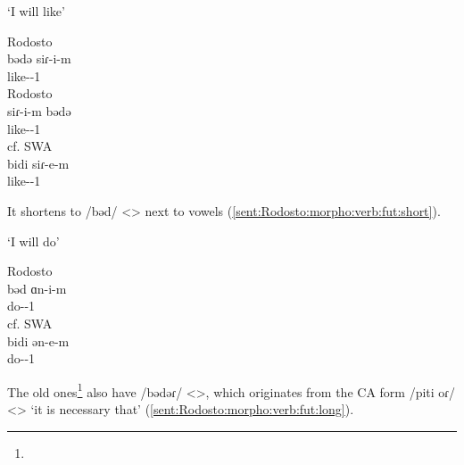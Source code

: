 \begin{exe}
	\ex `I will like' \label{sent:Rodosto:morpho:verb:fut:move}
	\begin{xlist}
		\ex Rodosto \\ \gll
		bədə siɾ-i-m \\
		{\fut} like-{\thgloss}-1{\sg} \\
		\trans {}
		\ex Rodosto \\\gll
		siɾ-i-m bədə\\
		like-{\thgloss}-1{\sg} {\fut} \\
		\trans {}
		\ex cf. SWA \\ \gll
		bidi siɾ-e-m \\
		{\fut} like-{\thgloss}-1{\sg} \\
		\trans {}
	\end{xlist}
	
\end{exe}


It shortens to /bəd/ <> next to vowels (\ref{sent:Rodosto:morpho:verb:fut:short}).



\begin{exe}
	\ex `I will do' \label{sent:Rodosto:morpho:verb:fut:short}
	
	\begin{xlist}
		\ex Rodosto \\ \gll
		bəd ɑn-i-m \\
		{\fut} do-{\thgloss}-1{\sg} \\
		\trans \armenian{բըդ անիմ}
		\ex cf. SWA \\ \gll
		bidi ən-e-m \\
		{\fut} do-{\thgloss}-1{\sg} \\
		\trans \armenian{պիտի ընեմ}
	\end{xlist} 
\end{exe}

The old ones\footnote{} also have /bədəɾ/ <>, which originates from the CA form /piti oɾ/ <> `it is necessary that' (\ref{sent:Rodosto:morpho:verb:fut:long}). 

